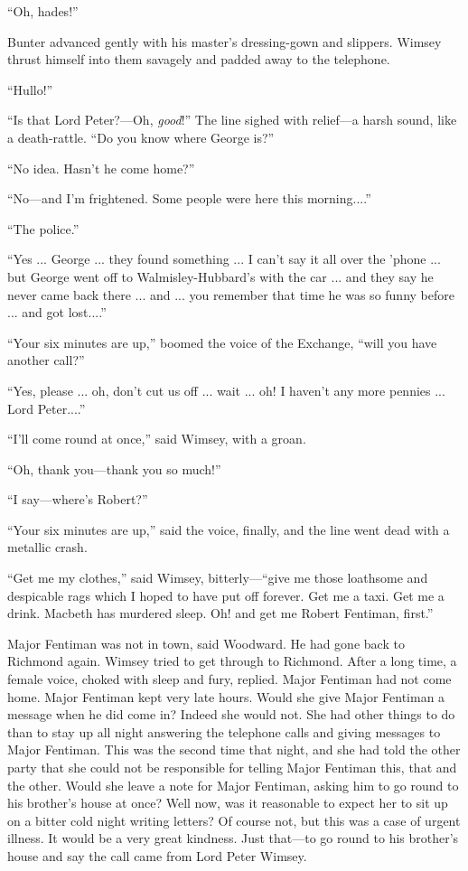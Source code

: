 \enquote{Oh, hades!}

Bunter advanced gently with his master's dressing-gown and slippers. Wimsey thrust himself into them savagely and padded away to the telephone.

\enquote{Hullo!}

\enquote{Is that Lord Peter?---Oh, \textit{good}!} The line sighed with relief\allowbreak---\allowbreak a harsh sound, like a death-rattle. \enquote{Do you know where George is?}

\enquote{No idea. Hasn't he come home?}

\enquote{No\allowbreak---\allowbreak and I'm frightened. Some people were here this morning....}

\enquote{The police.}

\enquote{Yes ... George ... they found something ... I can't say it all over the 'phone ... but George went off to Walmisley-Hubbard's with the car ... and they say he never came back there ... and ... you remember that time he was so funny before ... and got lost....}

\enquote{Your six minutes are up,} boomed the voice of the Exchange, \enquote{will you have another call?}

\enquote{Yes, please ... oh, don't cut us off ... wait ... oh! I haven't any more pennies ... Lord Peter....}

\enquote{I'll come round at once,} said Wimsey, with a groan.

\enquote{Oh, thank you\allowbreak---\allowbreak thank you so much!}

\enquote{I say\allowbreak---\allowbreak where's Robert?}

\enquote{Your six minutes are up,} said the voice, finally, and the line went dead with a metallic crash.

\enquote{Get me my clothes,} said Wimsey, bitterly---\enquote{give me those loathsome and despicable rags which I hoped to have put off forever. Get me a taxi. Get me a drink. Macbeth has murdered sleep. Oh! and get me Robert Fentiman, first.}

Major Fentiman was not in town, said Woodward. He had gone back to Richmond again. Wimsey tried to get through to Richmond. After a long time, a female voice, choked with sleep and fury, replied. Major Fentiman had not come home. Major Fentiman kept very late hours. Would she give Major Fentiman a message when he did come in? Indeed she would not. She had other things to do than to stay up all night answering the telephone calls and giving messages to Major Fentiman. This was the second time that night, and she had told the other party that she could not be responsible for telling Major Fentiman this, that and the other. Would she leave a note for Major Fentiman, asking him to go round to his brother's house at once? Well now, was it reasonable to expect her to sit up on a bitter cold night writing letters? Of course not, but this was a case of urgent illness. It would be a very great kindness. Just that\allowbreak---\allowbreak to go round to his brother's house and say the call came from Lord Peter Wimsey.

